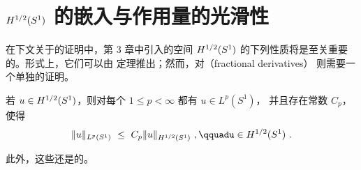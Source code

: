 
\section{\texorpdfstring{$H^{1/2}(S^{1})$ 的嵌入与作用量的光滑性}{H1/2(S1) 的嵌入与作用量的光滑性}}
\label{sec:embeddings-action-smoothness}

%
%
%
%

在下文关于\trActionFunctional{}\trSmoothness{}的证明中，第 3 章中引入的空间%
 $H^{1/2}(S^{1})$ 的下列\trEmbedding{}性质将是至关重要的。形式上，它们可以由%
\trSobolev\trEmbedding{}定理推出；然而，对\textbf{\trFractional\trDerivative}（fractional derivatives）%
则需要一个单独的证明。

\begin{theorem}\label{thm:hhalf-lp-embedding}
若 $u\in H^{1/2}(S^{1})$，则对每个 $1\leq p<\infty$ 都有 $u\in L^{p}(S^{1})$，%
并且存在常数 $C_{p}$，使得
\[
\|u\|_{L^{p}(S^{1})}\ \leq\ C_{p}\|u\|_{\Hh{1}{2}(S^{1})}\ ,\qquad%
u\in\Hh{1}{2}(S^{1})\ .
\]

此外，这些\trEmbedding{}还是\trCompact{}的。
\end{theorem}

